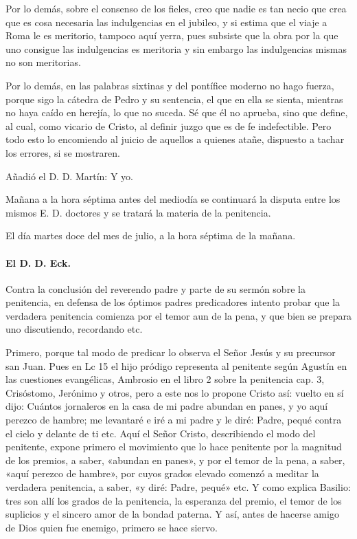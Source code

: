 Por lo demás, sobre el consenso de los fieles, creo que nadie es tan necio que crea que es cosa necesaria las indulgencias en el jubileo, y si estima que el viaje a Roma le es meritorio, tampoco aquí yerra, pues subsiste que la obra por la que uno consigue las indulgencias es meritoria y sin embargo las indulgencias mismas no son meritorias.

Por lo demás, en las palabras sixtinas y del pontífice moderno no hago fuerza, porque sigo la cátedra de Pedro y su sentencia, el que en ella se sienta, mientras no haya caído en herejía, lo que no suceda. Sé que él no aprueba, sino que define, al cual, como vicario de Cristo, al definir juzgo que es de fe indefectible. Pero todo esto lo encomiendo al juicio de aquellos a quienes atañe, dispuesto a tachar los errores, si se mostraren.

Añadió el D. D. Martín: Y yo.

\marginpar{\small[359]} Mañana a la hora séptima antes del mediodía se continuará la disputa entre los mismos E. D. doctores y se tratará la materia de la penitencia.

El día martes doce del mes de julio, a la hora séptima de la mañana.

\paragraph*{El D. D. Eck.}

Contra la conclusión del reverendo padre y parte de su sermón sobre la penitencia, en defensa de los óptimos padres predicadores intento probar que la verdadera penitencia comienza por el temor aun de la pena, y que bien se prepara uno discutiendo, recordando etc.

Primero, porque tal modo de predicar lo observa el Señor Jesús y su precursor san Juan. Pues en Lc 15 el hijo pródigo representa al penitente según Agustín en las cuestiones evangélicas, Ambrosio en el libro 2 sobre la penitencia cap. 3, Crisóstomo, Jerónimo y otros, pero a este nos lo propone Cristo así: vuelto en sí dijo: Cuántos jornaleros en la casa de mi padre abundan en panes, y yo aquí perezco de hambre; me levantaré e iré a mi padre y le diré: Padre, pequé contra el cielo y delante de ti etc. Aquí el Señor Cristo, describiendo el modo del penitente, expone primero el movimiento que lo hace penitente por la magnitud de los premios, a saber, «abundan en panes», y por el temor de la pena, a saber, «aquí perezco de hambre», por cuyos grados elevado comenzó a meditar la verdadera penitencia, a saber, «y diré: Padre, pequé» etc. Y como explica Basilio: tres son allí los grados de la penitencia, la esperanza del premio, el temor de los suplicios y el sincero amor de la bondad paterna. Y así, antes de hacerse amigo de Dios quien fue enemigo, primero se hace siervo.

